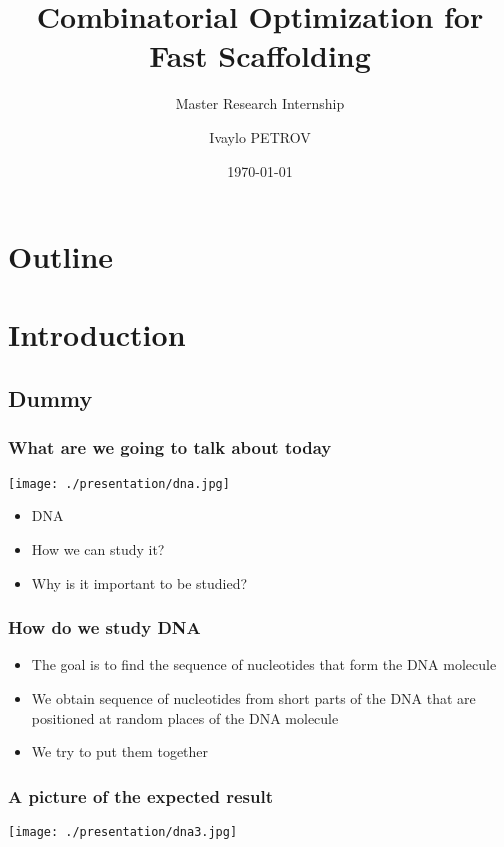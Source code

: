 \documentclass[compress]{beamer}
\title{Combinatorial Optimization for Fast Scaffolding}
\subtitle{Master Research Internship}
\author{Ivaylo PETROV}
\institute{University of Rennes 1}
\date{\today}
\begin{document}
\begin{frame}
  \titlepage
\end{frame}

\section*{Outline} %
\label{sec:Outline}
  \begin{frame}
    \tableofcontents
  \end{frame}

\section{Introduction} %
\label{sec:Introduction}

\subsection*{Dummy} %
\label{sub:Dummy}

  \begin{frame}
    \frametitle{What are we going to talk about today}
    \begin{multicols}{2}
      {\texttt{[image: ./presentation/dna.jpg]}}
      \columnbreak
      \begin{itemize}
        \item DNA
        \item How we can study it?
        \item Why is it important to be studied?
      \end{itemize}
  \end{multicols}
  \end{frame}

  \begin{frame}
    \frametitle{How do we study DNA}
    \begin{itemize}
      \item The goal is to find the sequence of nucleotides that form the DNA
        molecule
      \item We obtain sequence of nucleotides from short parts of the DNA that
        are positioned at random places of the DNA molecule
      \item We try to put them together
    \end{itemize}
  \end{frame}

  \begin{frame}
    \frametitle{A picture of the expected result}
    {\texttt{[image: ./presentation/dna3.jpg]}}
  \end{frame}
  
\end{document}
